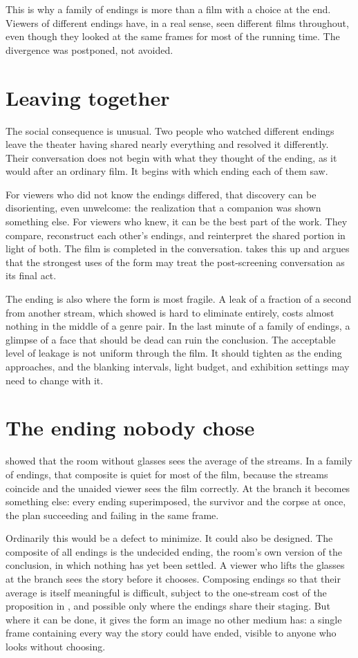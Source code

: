 This is why a family of endings is more than a film with a choice at the end. Viewers of different endings have, in a real sense, seen different films throughout, even though they looked at the same frames for most of the running time. The divergence was postponed, not avoided.

\section{Leaving together}

The social consequence is unusual. Two people who watched different endings leave the theater having shared nearly everything and resolved it differently. Their conversation does not begin with what they thought of the ending, as it would after an ordinary film. It begins with which ending each of them saw.

For viewers who did not know the endings differed, that discovery can be disorienting, even unwelcome: the realization that a companion was shown something else. For viewers who knew, it can be the best part of the work. They compare, reconstruct each other's endings, and reinterpret the shared portion in light of both. The film is completed in the conversation.  takes this up and argues that the strongest uses of the form may treat the post-screening conversation as its final act.

The ending is also where the form is most fragile. A leak of a fraction of a second from another stream, which  showed is hard to eliminate entirely, costs almost nothing in the middle of a genre pair. In the last minute of a family of endings, a glimpse of a face that should be dead can ruin the conclusion. The acceptable level of leakage is not uniform through the film. It should tighten as the ending approaches, and the blanking intervals, light budget, and exhibition settings may need to change with it.

\section{The ending nobody chose}

 showed that the room without glasses sees the average of the streams. In a family of endings, that composite is quiet for most of the film, because the streams coincide and the unaided viewer sees the film correctly. At the branch it becomes something else: every ending superimposed, the survivor and the corpse at once, the plan succeeding and failing in the same frame.

Ordinarily this would be a defect to minimize. It could also be designed. The composite of all endings is the undecided ending, the room's own version of the conclusion, in which nothing has yet been settled. A viewer who lifts the glasses at the branch sees the story before it chooses. Composing endings so that their average is itself meaningful is difficult, subject to the one-stream cost of the proposition in , and possible only where the endings share their staging. But where it can be done, it gives the form an image no other medium has: a single frame containing every way the story could have ended, visible to anyone who looks without choosing.
